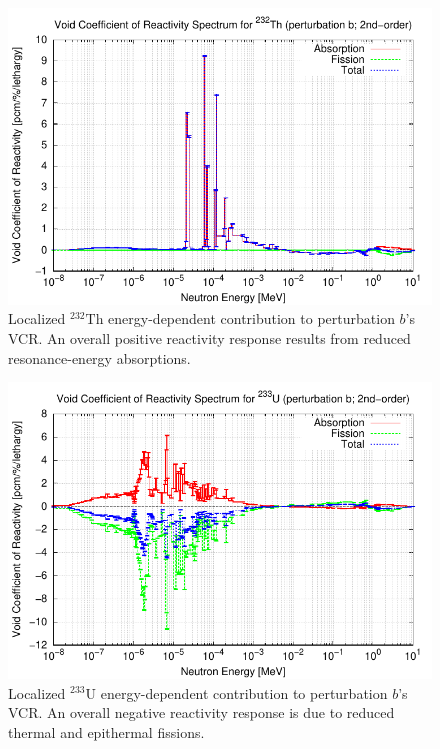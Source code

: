 \documentclass[11pt]{article}
\newcommand{\iso}[2]{$^{#2}\mathrm{#1}$}
\begin{document}
\clearpage
\begin{figure}[p]
  \centering
  \includegraphics[width=\textwidth, trim=0 0 0 0.275in, clip]{./img/Th-b-SpectraAlpha2-Th-232.pdf}
  \caption{Localized \iso{Th}{232} energy-dependent contribution to perturbation $b$'s VCR. An overall positive reactivity response results from reduced resonance-energy absorptions.}
  \label{fig:alphaETh}
\end{figure}

\clearpage
\begin{figure}[p]
  \centering
  \includegraphics[width=\textwidth, trim=0 0 0 0.275in, clip]{./img/Th-b-SpectraAlpha2-U-233.pdf}
  \caption{Localized \iso{U}{233} energy-dependent contribution to perturbation $b$'s VCR. An overall negative reactivity response is due to reduced thermal and epithermal fissions.}
  \label{fig:alphaEU}
\end{figure}
\end{document}
